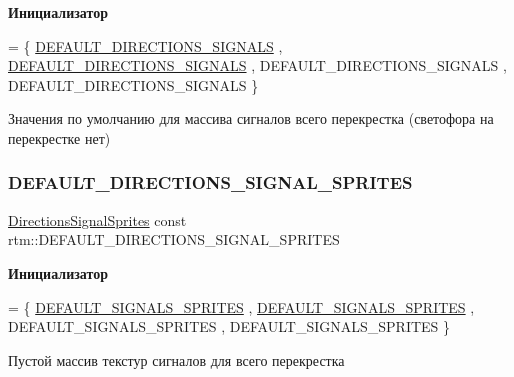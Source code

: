 {\bfseries Инициализатор}
\begin{DoxyCode}
= \{
        \hyperlink{namespacertm_ab5bb2d119539a5a60349a21fec8821f6}{DEFAULT\_DIRECTIONS\_SIGNALS}
        , \hyperlink{namespacertm_ab5bb2d119539a5a60349a21fec8821f6}{DEFAULT\_DIRECTIONS\_SIGNALS}
        , DEFAULT\_DIRECTIONS\_SIGNALS
        , DEFAULT\_DIRECTIONS\_SIGNALS
    \}
\end{DoxyCode}


Значения по умолчанию для массива сигналов всего перекрестка (светофора на перекрестке нет) 

\mbox{\label{namespacertm_a88c10d12831a4c6e13e0babdf7c27b02}} 
\subsubsection{\texorpdfstring{D\+E\+F\+A\+U\+L\+T\+\_\+\+D\+I\+R\+E\+C\+T\+I\+O\+N\+S\+\_\+\+S\+I\+G\+N\+A\+L\+\_\+\+S\+P\+R\+I\+T\+ES}{DEFAULT\_DIRECTIONS\_SIGNAL\_SPRITES}}
{\footnotesize\ttfamily \hyperlink{namespacertm_ac9f276c8ed33ee992eb1a1f04a8254a0}{Directions\+Signal\+Sprites} const rtm\+::\+D\+E\+F\+A\+U\+L\+T\+\_\+\+D\+I\+R\+E\+C\+T\+I\+O\+N\+S\+\_\+\+S\+I\+G\+N\+A\+L\+\_\+\+S\+P\+R\+I\+T\+ES}

{\bfseries Инициализатор}
\begin{DoxyCode}
= \{
        \hyperlink{namespacertm_a83e72513cb0cd2f63cff211387bdbb31}{DEFAULT\_SIGNALS\_SPRITES}
        , \hyperlink{namespacertm_a83e72513cb0cd2f63cff211387bdbb31}{DEFAULT\_SIGNALS\_SPRITES}
        , DEFAULT\_SIGNALS\_SPRITES
        , DEFAULT\_SIGNALS\_SPRITES
    \}
\end{DoxyCode}


Пустой массив текстур сигналов для всего перекрестка 

\mbox{\label{namespacertm_aa92f0dfd3e94d47bed3e7dd2c2e82571}} 
